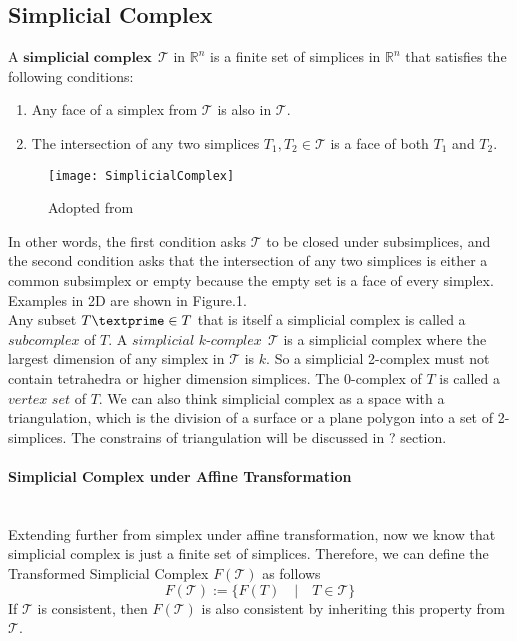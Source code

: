 \subsection{Simplicial Complex}
    \begin{definition*}
    A $\textbf{simplicial complex} ~~\mathcal T$ in $\mathbb{R}^n$ is a finite set of simplices in $\mathbb{R}^n$ that satisfies the following conditions:
    \begin{enumerate}[label =\arabic*.]
      \item Any face of a simplex from $\mathcal{T}$ is also in $\mathcal{T}$.
      \item The intersection of any two simplices ${T}_1, {T}_2 \in \mathcal{T}$ is a face of both ${T}_1$ and  ${T}_2$.
    \end{enumerate}
    \begin{figure}[b]
    \centering
    \texttt{[image: SimplicialComplex]}
    \caption[Simplicial Complex Example and Counterexample]{Adopted from~\cite{WEBSITE:1}}%
    \label{Fig2}
    \end{figure}
    \end{definition*}
    In other words, the first condition asks $\mathcal{T}$ to be closed under subsimplices, and the second condition asks that the intersection of any two simplices is either a common subsimplex or empty because the empty set is a face of every simplex. Examples in 2D are shown in Figure.1. \\
    \indent
    Any subset ${T\textprime}\in{T}$ that is itself a simplicial complex is called a $\textit{subcomplex}$ of ${T}$. A $\textit{simplicial k-complex} ~~\mathcal T$ is a simplicial complex where the largest dimension of any simplex in $\mathcal T$ is ${k}$. So a simplicial 2-complex must not contain tetrahedra or higher dimension simplices. The 0-complex of ${T}$ is called a $\textit{vertex set}$ of ${T}$. We can also think simplicial complex as a space with a triangulation, which is the division of a surface or a plane polygon into a set of 2-simplices. The constrains of triangulation will be discussed in ? section.\\

    \paragraph{Simplicial Complex under Affine Transformation}\mbox{}\\
    Extending further from simplex under affine transformation, now we know that simplicial complex is just a finite set of simplices. Therefore, we can define the Transformed Simplicial Complex $F(\mathcal{T})$ as follows
    \begin{equation*}
    F(\mathcal{T}) := \{F(T) \quad \vert \quad T\in \mathcal{T}\}
    \end{equation*}
    If $\mathcal{T}$ is consistent, then $F(\mathcal{T})$ is also consistent by inheriting this property from $\mathcal{T}$.

